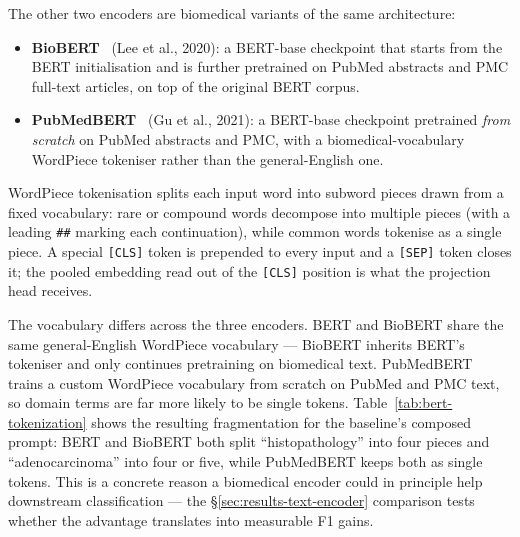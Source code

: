 The other two encoders are biomedical variants of the same architecture:

\begin{itemize}
    \item \textbf{BioBERT}~\cite{lee2020biobert} (Lee et al., 2020): a BERT-base checkpoint that starts from the BERT initialisation and is further pretrained on PubMed abstracts and PMC full-text articles, on top of the original BERT corpus.
    \item \textbf{PubMedBERT}~\cite{gu2021pubmedbert} (Gu et al., 2021): a BERT-base checkpoint pretrained \emph{from scratch} on PubMed abstracts and PMC, with a biomedical-vocabulary WordPiece tokeniser rather than the general-English one.
\end{itemize}

WordPiece tokenisation splits each input word into subword pieces drawn from a fixed vocabulary: rare or compound words decompose into multiple pieces (with a leading \texttt{\#\#} marking each continuation), while common words tokenise as a single piece. A special \texttt{[CLS]} token is prepended to every input and a \texttt{[SEP]} token closes it; the pooled embedding read out of the \texttt{[CLS]} position is what the projection head receives.

The vocabulary differs across the three encoders. BERT and BioBERT share the same general-English WordPiece vocabulary --- BioBERT inherits BERT's tokeniser and only continues pretraining on biomedical text. PubMedBERT trains a custom WordPiece vocabulary from scratch on PubMed and PMC text, so domain terms are far more likely to be single tokens. Table~\ref{tab:bert-tokenization} shows the resulting fragmentation for the baseline's composed prompt: BERT and BioBERT both split ``histopathology'' into four pieces and ``adenocarcinoma'' into four or five, while PubMedBERT keeps both as single tokens. This is a concrete reason a biomedical encoder could in principle help downstream classification --- the §\ref{sec:results-text-encoder} comparison tests whether the advantage translates into measurable F1 gains.


